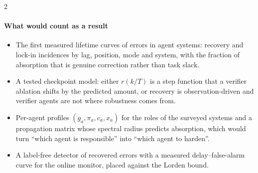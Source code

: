 \begin{multicols}{2}
\paragraph{What would count as a result}
\begin{itemize}[leftmargin=1.1em]
\item The first measured lifetime curves of errors in agent systems: recovery and lock-in incidences by lag, position, mode and system, with the fraction of absorption that is genuine correction rather than task slack.
\item A tested checkpoint model: either $r(k/T)$ is a step function that a verifier ablation shifts by the predicted amount, or recovery is observation-driven and verifier agents are not where robustness comes from.
\item Per-agent profiles $(g_a,\pi_a,c_a,x_a)$ for the roles of the surveyed systems and a propagation matrix whose spectral radius predicts absorption, which would turn ``which agent is responsible'' into ``which agent to harden''.
\item A label-free detector of recovered errors with a measured delay--false-alarm curve for the online monitor, placed against the Lorden bound.
\end{itemize}
\end{multicols}
